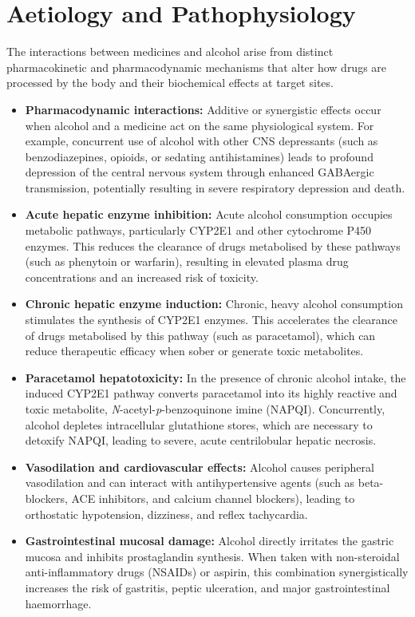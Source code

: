 \section*{Aetiology and Pathophysiology}
The interactions between medicines and alcohol arise from distinct pharmacokinetic and pharmacodynamic mechanisms that alter how drugs are processed by the body and their biochemical effects at target sites.
\begin{itemize}
    \item \textbf{Pharmacodynamic interactions:} Additive or synergistic effects occur when alcohol and a medicine act on the same physiological system. For example, concurrent use of alcohol with other CNS depressants (such as benzodiazepines, opioids, or sedating antihistamines) leads to profound depression of the central nervous system through enhanced GABAergic transmission, potentially resulting in severe respiratory depression and death.
    \item \textbf{Acute hepatic enzyme inhibition:} Acute alcohol consumption occupies metabolic pathways, particularly CYP2E1 and other cytochrome P450 enzymes. This reduces the clearance of drugs metabolised by these pathways (such as phenytoin or warfarin), resulting in elevated plasma drug concentrations and an increased risk of toxicity.
    \item \textbf{Chronic hepatic enzyme induction:} Chronic, heavy alcohol consumption stimulates the synthesis of CYP2E1 enzymes. This accelerates the clearance of drugs metabolised by this pathway (such as paracetamol), which can reduce therapeutic efficacy when sober or generate toxic metabolites.
    \item \textbf{Paracetamol hepatotoxicity:} In the presence of chronic alcohol intake, the induced CYP2E1 pathway converts paracetamol into its highly reactive and toxic metabolite, \textit{N}-acetyl-\textit{p}-benzoquinone imine (NAPQI). Concurrently, alcohol depletes intracellular glutathione stores, which are necessary to detoxify NAPQI, leading to severe, acute centrilobular hepatic necrosis.
    \item \textbf{Vasodilation and cardiovascular effects:} Alcohol causes peripheral vasodilation and can interact with antihypertensive agents (such as beta-blockers, ACE inhibitors, and calcium channel blockers), leading to orthostatic hypotension, dizziness, and reflex tachycardia.
    \item \textbf{Gastrointestinal mucosal damage:} Alcohol directly irritates the gastric mucosa and inhibits prostaglandin synthesis. When taken with non-steroidal anti-inflammatory drugs (NSAIDs) or aspirin, this combination synergistically increases the risk of gastritis, peptic ulceration, and major gastrointestinal haemorrhage.
\end{itemize}

